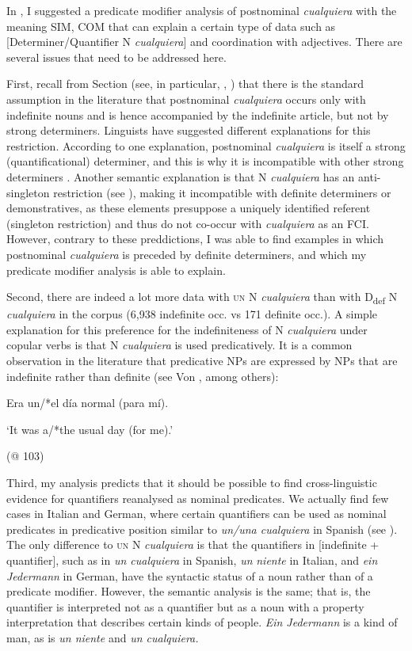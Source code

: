 In , I suggested a predicate modifier analysis of postnominal \textit{cualquiera} with the meaning SIM, COM that can explain a certain type of data such as [Determiner/Quantifier N \textit{cualquiera}] and coordination with adjectives. There are several issues that need to be addressed here.

  First, recall from Section  (see, in particular, \citealt{Lapesa1974}, \citealt{Rivero2011}) that there is the standard assumption in the literature that postnominal \textit{cualquiera} occurs only with indefinite nouns and is hence accompanied by the indefinite article, but not by strong determiners. Linguists have suggested different explanations for this restriction. According to one explanation, postnominal \textit{cualquiera} is itself a strong (quantificational) determiner, and this is why it is incompatible with other strong determiners \citep{Lapesa1974}. Another semantic explanation is that N \textit{cualquiera} has an anti-singleton restriction (see \citealt{Menéndez-Benito2010}), making it incompatible with definite determiners or demonstratives, as these elements presuppose a uniquely identified referent (singleton restriction) and thus do not co-occur with \textit{cualquiera} as an FCI. However, contrary to these preddictions, I was able to find examples in which postnominal \textit{cualquiera} is preceded by definite determiners, and which my predicate modifier analysis is able to explain.

  Second, there are indeed a lot more data with \textsc{un} N \textit{cualquiera} than with D\textsubscript{def} N \textit{cualquiera} in the corpus (6,938 indefinite occ. vs 171 definite occ.). A simple explanation for this preference for the indefiniteness of N \textit{cualquiera} under copular verbs is that N \textit{cualquiera} is used predicatively. It is a common observation in the literature that predicative NPs are expressed by NPs that are indefinite rather than definite (see Von \citealt{GeenhovenMcNally2005}, among others): 

  Era un/*el día normal (para mí).

  ‘It was a/*the usual day (for me).’

  (@ 103)

Third, my analysis predicts that it should be possible to find cross-linguistic evidence for quantifiers reanalysed as nominal predicates. We actually find few cases in Italian and German, where certain quantifiers can be used as nominal predicates in predicative position similar to \textit{un/una cualquiera} in Spanish (see ). The only difference to \textsc{un} N \textit{cualquiera} is that the quantifiers in [indefinite + quantifier], such as in \textit{un cualquiera} in Spanish, \textit{un} \textit{niente} in Italian, and \textit{ein Jedermann} in German, have the syntactic status of a noun rather than of a predicate modifier. However, the semantic analysis is the same; that is, the quantifier is interpreted not as a quantifier but as a noun with a property interpretation that describes certain kinds of people. \textit{Ein Jedermann} is a kind of man, as is \textit{un niente} and \textit{un cualquiera.}

